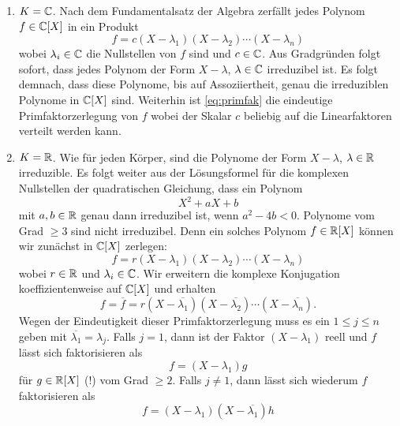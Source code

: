 \documentclass{book}
\begin{document}
\begin{exas}
    \label{exas:irred}
    \begin{enumerate}
        \item $K = \mathbb{C}$. Nach dem Fundamentalsatz der Algebra zerfällt jedes Polynom $f \in \mathbb{C}[X]$ in ein Produkt
            \begin{equation}
                    \label{eq:primfak}
                    f = c (X-\lambda_1) (X- \lambda_2) \cdots (X- \lambda_n)
            \end{equation}
            wobei $\lambda_i \in \mathbb{C}$ die Nullstellen von $f$ sind und $c \in
            \mathbb{C}$. Aus Gradgründen folgt sofort, dass jedes Polynom der Form $X-
            \lambda$, $\lambda \in \mathbb{C}$ irreduzibel ist. Es folgt demnach,
            dass diese Polynome, bis auf Assoziiertheit, genau die irreduziblen
            Polynome in $\mathbb{C}[X]$ sind. Weiterhin ist \eqref{eq:primfak} die
            eindeutige Primfaktorzerlegung von $f$ wobei der Skalar $c$
            beliebig auf die Linearfaktoren verteilt werden kann.
        \item $K = \mathbb{R}$. Wie für jeden Körper, sind die Polynome der Form $X -
            \lambda$, $\lambda \in \mathbb{R}$ irreduzible. Es folgt weiter aus der
            Lösungsformel für die komplexen Nullstellen der quadratischen
            Gleichung, dass ein Polynom
            \[
                X^2 + a X + b 
            \]
            mit $a,b \in \mathbb{R}$ genau dann irreduzibel ist, wenn $a^2 - 4b < 0$.
            Polynome vom Grad $\ge 3$ sind nicht irreduzibel. Denn ein
            solches Polynom $f \in \mathbb{R}[X]$ können wir zunächst in $\mathbb{C}[X]$ zerlegen:
            \[
                f = r(X-\lambda_1)(X- \lambda_2) \cdots (X- \lambda_n)
            \]
            wobei $r \in \mathbb{R}$ und $\lambda_i \in \mathbb{C}$. Wir erweitern die komplexe Konjugation koeffizientenweise auf $\mathbb{C}[X]$ und erhalten 
            \[
                f = \overline{f} = r(X-\overline{\lambda_1})(X- \overline{\lambda_2}) \cdots (X- \overline{\lambda_n}).
            \]
            Wegen der Eindeutigkeit dieser Primfaktorzerlegung muss es ein $1
            \le j  \le n$ geben mit $\overline{\lambda_1} = \lambda_j$. Falls
            $j = 1$, dann ist der Faktor $(X-\lambda_1)$ reell und $f$ lässt sich faktorisieren als
            \[
                f = (X - \lambda_1) g
            \]
            für $g \in \mathbb{R}[X]$ (!) vom Grad $\ge 2$. Falls $j \neq 1$, dann lässt sich wiederum $f$ faktorisieren als
            \[
                f = (X- \lambda_1) (X - \overline{\lambda_1}) h
            \]

\end{enumerate}
\end{exas}
\end{document}
